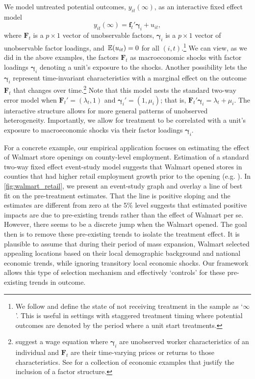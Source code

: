 \documentclass[12pt]{article}
\begin{document}
We model untreated potential outcomes, $y_{it}(\infty)$, as an interactive fixed effect model
\begin{equation}\label{eq:untreated_po}
    y_{it}(\infty) = \bm{f}_t' \bm{\gamma}_i + u_{it},
\end{equation}
where $\bm{F}_t$ is a $p \times 1$ vector of unobservable factors, $\bm \gamma_i$ is a $p \times 1$ vector of unobservable factor loadings, and $\expec{u_{it}} = 0$ for all $(i,t)$.\footnote{We follow \citet{Callaway_Santanna_2021} and define the state of not receiving treatment in the sample as `$\infty$'. This is useful in settings with staggered treatment timing where potential outcomes are denoted by the period where a unit start treatments.} We can view, as we did in the above examples, the factors $\bm{F}_t$ as macroeconomic shocks with factor loadings $\bm \gamma_i$ denoting a unit's exposure to the shocks. Another possibility lets the $\bm \gamma_i$ represent time-invariant characteristics with a marginal effect on the outcome $\bm{F}_t$ that changes over time.\footnote{\citet{Ahn_Lee_Schmidt_2013} suggest a wage equation where $\bm \gamma_i$ are unobserved worker characteristics of an individual and $\bm{F}_t$ are their time-varying prices or returns to those characteristics. See \citet{Bai_2009} for a collection of economic examples that justify the inclusion of a factor structure.} Note that this model nests the standard two-way error model when $\bm{F}_t' = (\lambda_t, 1)$ and $\bm \gamma_i' = (1, \mu_i)$; that is, $\bm{F}_t' \bm \gamma_i = \lambda_t + \mu_i$. The interactive structure allows for more general patterns of unobserved heterogeneity. Importantly, we allow for treatment to be correlated with a unit's exposure to macroeconomic shocks via their factor loadings $\bm{\gamma}_i$. 

For a concrete example, our empirical application focuses on estimating the effect of Walmart store openings on county-level employment. Estimation of a standard two-way fixed effect event-study model suggests that Walmart opened stores in counties that had higher retail employment growth prior to the opening (e.g. \citet{neumark2008effects}). In \autoref{fig:walmart_retail}, we present an event-study graph and overlay a line of best fit on the pre-treatment estimates. That the line is positive sloping and the estimates are different from zero at the 5\% level suggests that estimated positive impacts are due to pre-existing trends rather than the effect of Walmart per se. However, there seems to be a discrete jump when the Walmart opened. The goal then is to remove these pre-existing trends to isolate the treatment effect. It is plausible to assume that during their period of mass expansion, Walmart selected appealing locations based on their local demographic background and national economic trends, while ignoring transitory local economic shocks. Our framework allows this type of selection mechanism and effectively `controls' for these pre-existing trends in outcome.
\end{document}
